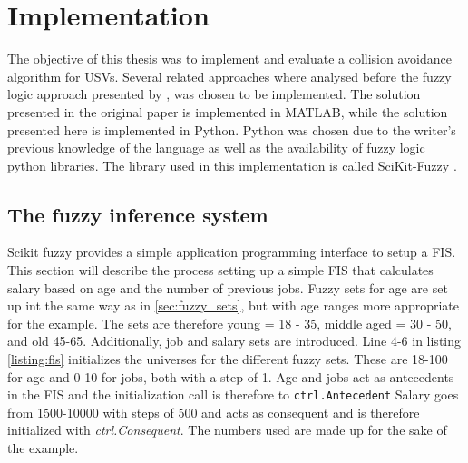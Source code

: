 

\chapter{Implementation}
\label{chap_impl}
The objective of this thesis was to implement and evaluate a  collision avoidance  algorithm for USVs. Several related approaches where analysed before the fuzzy logic approach presented by \textcite{perera2012intelligent}, was chosen to be implemented.
The solution presented in the original paper is implemented in MATLAB, while the solution presented here is implemented in Python. Python was chosen due to the writer's previous knowledge of the language as well as the availability of fuzzy logic python libraries. The library used in this implementation is called SciKit-Fuzzy \cite{josh_warner_2017_1002946}.

\section{The fuzzy inference system}
Scikit fuzzy provides a simple application programming interface to setup a FIS. This section will describe the process setting up a simple FIS that calculates salary based on age and the number of previous jobs. Fuzzy sets for age are set up int the same way as in \ref{sec:fuzzy_sets}, but with age ranges more appropriate for the example. The sets are therefore young = 18 - 35, middle aged = 30 - 50, and old 45-65.  Additionally, job and salary sets are introduced. Line 4-6 in listing \ref{listing:fis} initializes the universes for the different fuzzy sets. These are 18-100 for age and 0-10 for jobs, both with a step of 1. Age and jobs act as antecedents in the FIS and the initialization call is therefore to  \texttt{ctrl.Antecedent} Salary goes from 1500-10000 with steps of 500 and acts as consequent and is therefore initialized with  \textit{ctrl.Consequent}. The numbers used are made up for the sake of the example.

